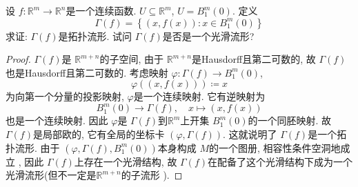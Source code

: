 \documentclass[../main.tex]{subfiles}
\begin{document}
\begin{exercise}{}{}
    设 \(  f:\mathbb{R} ^{m}\to \mathbb{R} ^{n}  \)是一个连续函数.  \( U\subseteq \mathbb{R} ^{m}  \),  \( U= B_{1}^{m}\left( 0 \right)   \). 定义 \[
     \Gamma \left( f \right)= \left\{ \left( x, f\left( x \right)  \right): x \in B_{1}^{m}\left( 0 \right)   \right\} 
    \]求证: \(   \Gamma \left( f \right)   \)是拓扑流形.  试问 \(   \Gamma \left( f \right)   \)是否是一个光滑流形?     
\end{exercise}

\begin{proof}
    \(   \Gamma \left( f \right)   \)是 \(  \mathbb{R} ^{m+ n}  \)的子空间, 由于 \(  \mathbb{R} ^{m+ n}  \)是Hausdorff且第二可数的, 故 \(   \Gamma \left( f \right)   \)也是Hausdorff且第二可数的.    考虑映射 \(   \varphi : \Gamma \left( f \right)\to B_{1}^{m}\left( 0 \right)    \), \[
     \varphi \left( \left( x,f\left( x \right)  \right)  \right)\coloneqq x 
    \] 为向第一个分量的投影映射,  \(   \varphi   \)是一个连续映射. 它有逆映射为 \[
 B_{1}^{m}\left( 0 \right)\to  \Gamma \left( f \right),\quad      x\mapsto  \left( x,f\left( x \right)  \right) 
    \] 也是一个连续映射. 因此 \(   \varphi   \)是 \(   \Gamma \left( f \right)   \)到\(  \mathbb{R} ^{m}  \)上开集 \(  B_{1}^{m}\left( 0 \right)   \)的一个同胚映射. 故 \(   \Gamma \left( f \right)   \)是局部欧的, 它有全局的坐标卡 \(  \left(  \varphi ,  \Gamma \left( f \right)  \right)   \).  这就说明了 \(   \Gamma \left( f \right)   \)是一个拓扑流形.  由于 \(  \left(  \varphi ,  \Gamma \left( f \right), B_{1}^{m}\left( 0 \right)   \right) \)本身构成 \(  M  \)的一个图册, 相容性条件空洞地成立 ,  因此 \(   \Gamma \left( f \right)   \)上存在一个光滑结构, 故 \(   \Gamma \left( f \right)   \)在配备了这个光滑结构下成为一个光滑流形(但不一定是\(  \mathbb{R} ^{m+ n}  \)的子流形 ).   
\end{proof}
\end{document}
